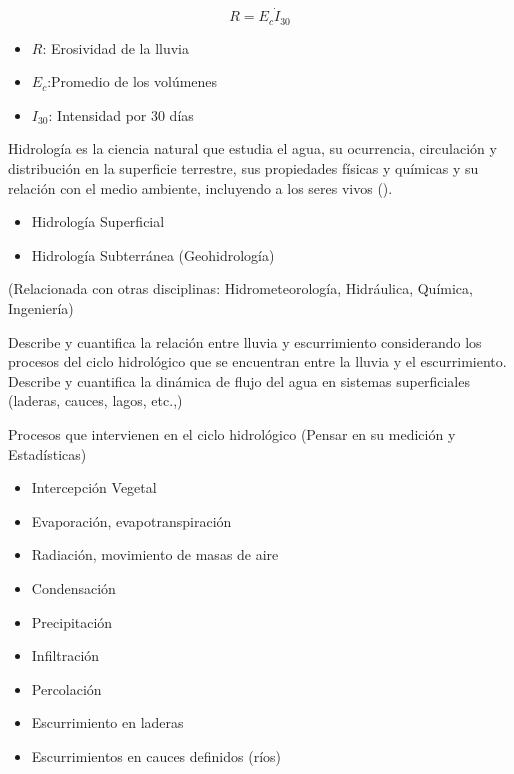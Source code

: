 \begin{equation}
    R = E_c\dot I_{30}
\end{equation}
\begin{notation}
    \begin{itemize}
        \item $R$: Erosividad de la lluvia 
        \item $E_c$:Promedio de los volúmenes
        \item $I_{30}$: Intensidad por 30 días
    \end{itemize}
\end{notation}

\begin{definition}
    Hidrología es la ciencia natural que estudia el agua, su ocurrencia, circulación y distribución en la superficie terrestre, sus propiedades físicas y químicas y su relación con el medio ambiente, incluyendo a los seres vivos (\cite{chow1964handbook}).
    \begin{itemize}
        \item Hidrología Superficial
        \item Hidrología Subterránea (Geohidrología)
    \end{itemize}
    (Relacionada con otras disciplinas: Hidrometeorología, Hidráulica, Química, Ingeniería)

    Describe y cuantifica la relación entre lluvia y escurrimiento considerando los procesos del ciclo hidrológico que se encuentran entre la lluvia y el escurrimiento. Describe y cuantifica la dinámica de flujo del agua en sistemas superficiales (laderas, cauces, lagos, etc.,)
\end{definition}

Procesos que intervienen en el ciclo hidrológico (Pensar en su medición y Estadísticas)
\begin{itemize}
    \item Intercepción Vegetal
    \item Evaporación, evapotranspiración
    \item Radiación, movimiento de masas de aire
    \item Condensación
    \item Precipitación
    \item Infiltración
    \item Percolación
    \item Escurrimiento en laderas
    \item Escurrimientos en cauces definidos (ríos)
\end{itemize}

